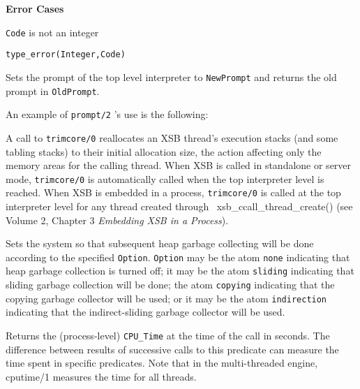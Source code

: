 \begin{description}
{\bf Error Cases}
\bi
\item 	{\tt Code} is not an integer
\bi
\item 	{\tt type\_error(Integer,Code)}
\ei
\ei

    Sets the prompt of the top level interpreter to {\tt NewPrompt} and 
    returns the old prompt in {\tt OldPrompt}.

    An example of {\tt prompt/2} 's use is the following:


%
A call to {\tt trimcore/0} reallocates an XSB thread's execution
stacks (and some tabling stacks) to their initial allocation size, the
action affecting only the memory areas for the calling thread.  When
XSB is called in standalone or server mode, {\tt trimcore/0} is
automatically called when the top interpreter level is reached.  When
XSB is embedded in a process, {\tt trimcore/0} is called at the top
interpreter level for any thread created through
{\ xsb\_ccall\_thread\_create()} (see Volume 2, Chapter 3 {\em
  Embedding XSB in a Process}).

Sets the system so that subsequent heap garbage collecting will be
done according to the specified {\tt Option}.  {\tt Option} may be the
atom \verb|none| indicating that heap garbage collection is turned
off; it may be the atom \verb|sliding| indicating that sliding garbage
collection will be done; the atom \verb|copying| indicating that the
copying garbage collector will be used; or it may be the atom
\verb|indirection| indicating that the indirect-sliding garbage
collector will be used.
 
%
Returns the (process-level) {\tt CPU\_Time} at the time of the call in
seconds.  The difference between results of successive calls to this
predicate can measure the time spent in specific predicates.  Note
that in the multi-threaded engine, {cputime/1} measures the time for
all threads.


\end{description}
